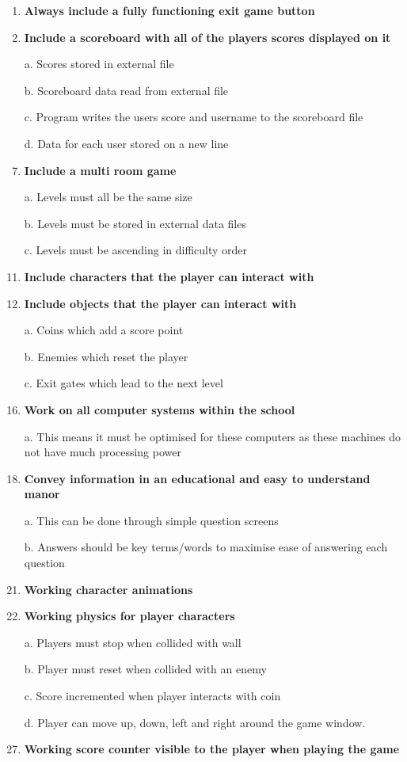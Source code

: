 \documentclass[12pt]{report}
\begin{document}
\footnotesize
\begin{enumerate}
    \item \textbf{Always include a fully functioning exit game button}
    \item \textbf{Include a scoreboard with all of the players scores displayed on it}
    \setlength{\itemindent}{0.5in}
    \item[a.]Scores stored in external file
    \item[b.]Scoreboard data read from external file
    \item[c.]Program writes the users score and username to the scoreboard file
    \item[d.]Data for each user stored on a new line
    \setlength{\itemindent}{0in}
    \item \textbf{Include a multi room game}
    \setlength{\itemindent}{0.5in}
    \item[a.] Levels must all be the same size
    \item[b.] Levels must be stored in external data files
    \item[c.] Levels must be ascending in difficulty order
    \setlength{\itemindent}{0in}
    \item \textbf{Include characters that the player can interact with}
    \item \textbf{Include objects that the player can interact with}
    \setlength{\itemindent}{0.5in}
    \item[a.] Coins which add a score point
    \item[b.] Enemies which reset the player
    \item[c.] Exit gates which lead to the next level
    \setlength{\itemindent}{0in}
    \item \textbf{Work on all computer systems within the school}
    \setlength{\itemindent}{0.5in}
    \item[a.] This means it must be optimised for these computers as these machines do not have much processing power
    \setlength{\itemindent}{0in}
    \item \textbf{Convey information in an educational and easy to understand manor}
    \setlength{\itemindent}{0.5in}
    \item[a.] This can be done through simple question screens
    \item[b.] Answers should be key terms/words to maximise ease of answering each question
    \setlength{\itemindent}{0in}
    \item \textbf{Working character animations}
    \item \textbf{Working physics for player characters}
    \setlength{\itemindent}{0.5in}
    \item[a.] Players must stop when collided with wall
    \item[b.] Player must reset when collided with an enemy
    \item[c.] Score incremented when player interacts with coin
    \item[d.] Player can move up, down, left and right around the game window.
    \setlength{\itemindent}{0in}
    \item \textbf{Working score counter visible to the player when playing the game}
\end{enumerate}
\end{document}
